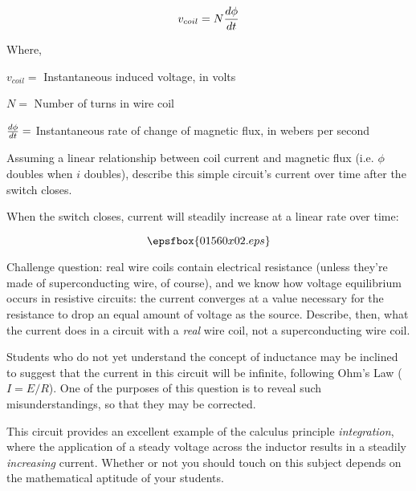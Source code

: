 $$v_{coil} = N {d \phi \over dt}$$

\noindent
Where,

$v_{coil} =$ Instantaneous induced voltage, in volts

$N =$ Number of turns in wire coil

${d \phi \over dt} =$ Instantaneous rate of change of magnetic flux, in webers per second

\vskip 10pt

Assuming a linear relationship between coil current and magnetic flux (i.e. $\phi$ doubles when $i$ doubles), describe this simple circuit's current over time after the switch closes.







When the switch closes, current will steadily increase at a linear rate over time:

$$\epsfbox{01560x02.eps}$$

\vskip 10pt

Challenge question: real wire coils contain electrical resistance (unless they're made of superconducting wire, of course), and we know how voltage equilibrium occurs in resistive circuits: the current converges at a value necessary for the resistance to drop an equal amount of voltage as the source.  Describe, then, what the current does in a circuit with a {\it real} wire coil, not a superconducting wire coil.







Students who do not yet understand the concept of inductance may be inclined to suggest that the current in this circuit will be infinite, following Ohm's Law ($I = E/R$).  One of the purposes of this question is to reveal such misunderstandings, so that they may be corrected.

This circuit provides an excellent example of the calculus principle {\it integration}, where the application of a steady voltage across the inductor results in a steadily {\it increasing} current.  Whether or not you should touch on this subject depends on the mathematical aptitude of your students.




